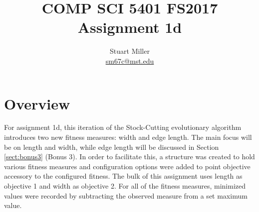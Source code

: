 \documentclass[11pt]{article}
\begin{document}
\title{COMP SCI 5401 FS2017 Assignment 1d}
\author{Stuart Miller\\\href{mailto:sm67c@mst.edu}{sm67c@mst.edu}}
\maketitle


\section{Overview}\label{sect:overview}
For assignment 1d, this iteration of the Stock-Cutting evolutionary algorithm introduces two new fitness measures: width and edge length. The main focus will be on length and width, while edge length will be discussed in Section \ref{sect:bonus3} (Bonus 3).
In order to facilitate this, a structure was created to hold various fitness measures and configuration options were added to point objective accessory to the configured fitness. The bulk of this assignment uses length as objective 1 and width as objective 2. For all of the fitness measures, minimized values were recorded by subtracting the observed measure from a set maximum value.
\end{document}
